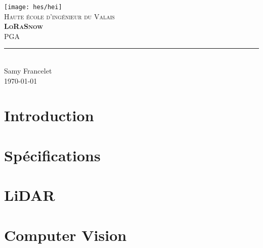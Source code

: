 \documentclass[11pt,titlepage]{report}
\begin{document}
\begin{titlepage}
	\centering
    \texttt{[image: hes/hei]}\\[1cm] 	%
    \textsc{\LARGE Haute école d'ingénieur du Valais}\\ \vspace{\fill}
    \textbf{\textsc{\fontsize{35}{35}\selectfont LoRaSnow}}\\ \vspace{\fill}
	\textsc{\LARGE PGA}\\[0.4cm]
	\rule{\linewidth}{0.2 mm} \\[0.5 cm]
	Samy Francelet \\
	\today
\end{titlepage}
\restoregeometry

\tableofcontents
\listoffigures
\listoftables

\chapter{Introduction}


\chapter{Spécifications}


\chapter{LiDAR}



\chapter{Computer Vision}




\printbibliography[heading=bibintoc]
\end{document}
